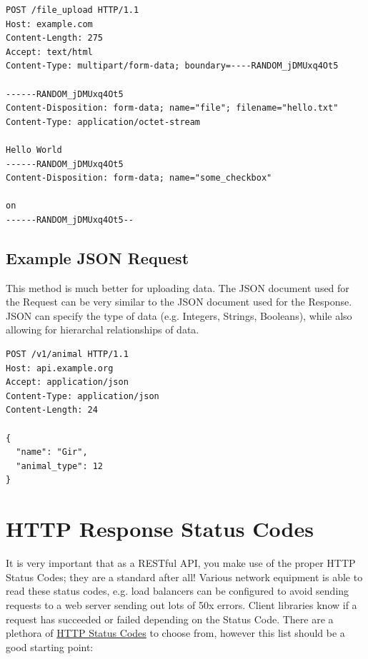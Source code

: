 \documentclass{book}
\begin{document}
\begin{verbatim}
POST /file_upload HTTP/1.1
Host: example.com
Content-Length: 275
Accept: text/html
Content-Type: multipart/form-data; boundary=----RANDOM_jDMUxq4Ot5

------RANDOM_jDMUxq4Ot5
Content-Disposition: form-data; name="file"; filename="hello.txt"
Content-Type: application/octet-stream

Hello World
------RANDOM_jDMUxq4Ot5
Content-Disposition: form-data; name="some_checkbox"

on
------RANDOM_jDMUxq4Ot5--
\end{verbatim}

\section{Example JSON Request}

This method is much better for uploading data. The JSON document used for the Request can be very similar to the JSON document used for the Response. JSON can specify the type of data (e.g. Integers, Strings, Booleans), while also allowing for hierarchal relationships of data.

\begin{verbatim}
POST /v1/animal HTTP/1.1
Host: api.example.org
Accept: application/json
Content-Type: application/json
Content-Length: 24

{
  "name": "Gir",
  "animal_type": 12
}
\end{verbatim}


\chapter{HTTP Response Status Codes}

It is very important that as a RESTful API, you make use of the proper HTTP Status Codes; they are a standard after all! Various network equipment is able to read these status codes, e.g. load balancers can be configured to avoid sending requests to a web server sending out lots of 50x errors. Client libraries know if a request has succeeded or failed depending on the Status Code. There are a plethora of \href{http://www.w3.org/Protocols/rfc2616/rfc2616-sec10.html}{HTTP Status Codes} to choose from, however this list should be a good starting point:
\end{document}
